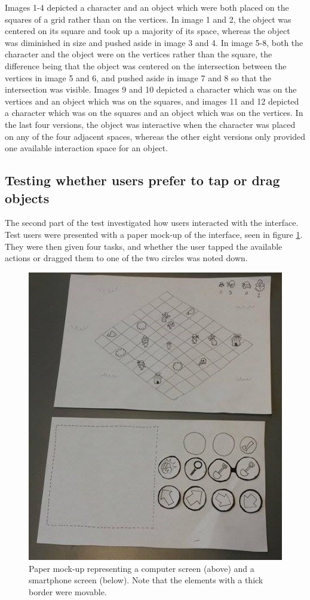 Images 1-4 depicted a character and an object which were both placed on the squares of a grid rather than on the vertices. In image 1 and 2, the object was centered on its square and took up a majority of its space, whereas the object was diminished in size and pushed aside in image 3 and 4. In image 5-8, both the character and the object were on the vertices rather than the square, the difference being that the object was centered on the intersection between the vertices in image 5 and 6, and pushed aside in image 7 and 8 so that the intersection was visible. Images 9 and 10 depicted a character which was on the vertices and an object which was on the squares, and images 11 and 12 depicted a character which was on the squares and an object which was on the vertices. In the last four versions, the object was interactive when the character was placed on any of the four adjacent spaces, whereas the other eight versions only provided one available interaction space for an object.

\subsection{Testing whether users prefer to tap or drag objects}
The second part of the test investigated how users interacted with the interface. Test users were presented with a paper mock-up of the interface, seen in figure \ref{fig:mockup}. They were then given four tasks, and whether the user tapped the available actions or dragged them to one of the two circles was noted down.

\begin{figure}[h!]
	\centering
	\includegraphics[scale=0.7]{figures/paper_1.jpg}
	\caption{Paper mock-up representing a computer screen (above) and a smartphone screen (below). Note that the elements with a thick border were movable. \label{fig:mockup}}
\end{figure}

